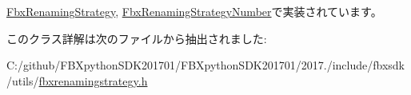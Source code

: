 \hyperlink{class_fbx_renaming_strategy_af21a13396dd6726e87b123f398ac79f2}{Fbx\+Renaming\+Strategy}, \hyperlink{class_fbx_renaming_strategy_number_ae619f9e95e3fcb215a12728dfb739659}{Fbx\+Renaming\+Strategy\+Number}で実装されています。



このクラス詳解は次のファイルから抽出されました\+:\begin{DoxyCompactItemize}
\item 
C\+:/github/\+F\+B\+Xpython\+S\+D\+K201701/\+F\+B\+Xpython\+S\+D\+K201701/2017./include/fbxsdk/utils/\hyperlink{fbxrenamingstrategy_8h}{fbxrenamingstrategy.\+h}\end{DoxyCompactItemize}

